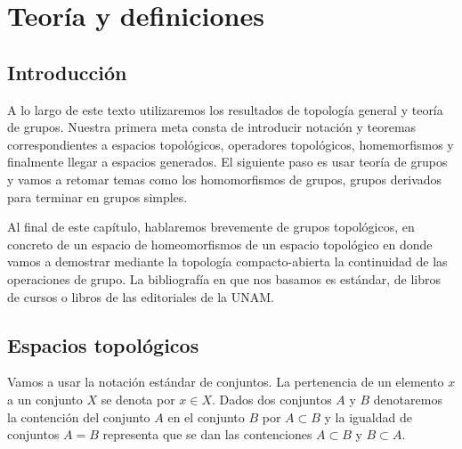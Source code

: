



\tableofcontents

\chapter*{Teoría y definiciones}	

\section*{Introducción}

A lo largo de este texto utilizaremos los resultados de topología general y teoría de grupos. Nuestra primera meta consta de introducir notación y teoremas correspondientes a espacios topológicos, operadores topológicos, homemorfismos y finalmente llegar a espacios generados. El siguiente paso es usar teoría de grupos y vamos a retomar temas como los homomorfismos de grupos, grupos derivados para terminar en grupos simples. 

Al final de este capítulo, hablaremos brevemente de grupos topológicos, en concreto de un espacio de homeomorfismos de un espacio topológico en donde vamos a demostrar mediante la topología compacto-abierta la continuidad de las operaciones de grupo. La bibliografía en que nos basamos es estándar, de libros de cursos o libros de las editoriales de la UNAM. 

\section*{Espacios topológicos}

Vamos a usar la notación estándar de conjuntos. La pertenencia de un elemento $x$ a un conjunto $X$ se denota por $x \in X$. Dados dos conjuntos $A$ y $B$ denotaremos la contención del conjunto $A$ en el conjunto $B$ por $A \subset B$ y la igualdad de conjuntos $A=B$ representa que se dan las contenciones $A \subset B$ y $B \subset A$.


